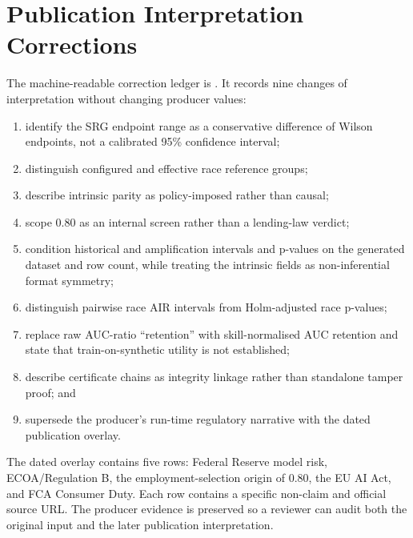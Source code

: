 \section{Publication Interpretation Corrections}

The machine-readable correction ledger is
. It records nine changes of
interpretation without changing producer values:

\begin{enumerate}
  \small
  \setlength{\itemsep}{0.1em}
  \setlength{\parsep}{0pt}
  \setlength{\parskip}{0pt}
  \setlength{\topsep}{0.3em}
  \item identify the SRG endpoint range as a conservative difference of Wilson endpoints, not a
        calibrated 95\% confidence interval;
  \item distinguish configured and effective race reference groups;
  \item describe intrinsic parity as policy-imposed rather than causal;
  \item scope 0.80 as an internal screen rather than a lending-law verdict;
  \item condition historical and amplification intervals and p-values on the generated dataset and
        row count, while treating the intrinsic fields as non-inferential format symmetry;
  \item distinguish pairwise race AIR intervals from Holm-adjusted race p-values;
  \item replace raw AUC-ratio ``retention'' with skill-normalised AUC retention and state that
        train-on-synthetic utility is not established;
  \item describe certificate chains as integrity linkage rather than standalone tamper proof; and
  \item supersede the producer's run-time regulatory narrative with the dated publication overlay.
\end{enumerate}

The dated overlay contains five rows: Federal Reserve model risk, ECOA/Regulation B, the
employment-selection origin of 0.80, the EU AI Act, and FCA Consumer Duty. Each row contains a
specific non-claim and official source URL. The producer evidence is preserved so a reviewer can
audit both the original input and the later publication interpretation.
